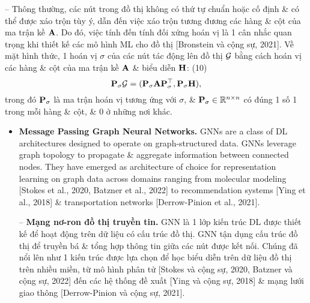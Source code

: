 \documentclass{article}
\begin{document}
\begin{itemize}
    -- Thông thường, các nút trong đồ thị không có thứ tự chuẩn hoặc cố định \& có thể được xáo trộn tùy ý, dẫn đến việc xáo trộn tương đương các hàng \& cột của ma trận kề ${\bf A}$. Do đó, việc tính đến tính đối xứng hoán vị là 1 cân nhắc quan trọng khi thiết kế các mô hình ML cho đồ thị [Bronstein và cộng sự, 2021]. Về mặt hình thức, 1 hoán vị $\sigma$ của các nút tác động lên đồ thị ${\cal G}$ bằng cách hoán vị các hàng \& cột của ma trận kề ${\bf A}$ \& biểu diễn ${\bf H}$: (10)
    \begin{equation*}
        {\bf P}_\sigma{\cal G} = ({\bf P}_\sigma{\bf A}{\bf P}_\sigma^\top,{\bf P}_\sigma{\bf H}),
    \end{equation*}
    trong đó ${\bf P}_\sigma$ là ma trận hoán vị tương ứng với $\sigma$, \& ${\bf P}_\sigma\in\mathbb{R}^{n\times n}$ có đúng 1 số 1 trong mỗi hàng \& cột, \& 0 ở những nơi khác.
    \begin{itemize}
        \item {\bf Message Passing Graph Neural Networks.} GNNs are a class of DL architectures designed to operate on graph-structured data. GNNs leverage graph topology to propagate \& aggregate information between connected nodes. They have emerged as architecture of choice for representation learning on graph data across domains ranging from molecular modeling [Stokes et al., 2020, Batzner et al., 2022] to recommendation systems [Ying et al., 2018] \& transportation networks [Derrow-Pinion et al., 2021].

        -- {\bf Mạng nơ-ron đồ thị truyền tin.} GNN là 1 lớp kiến trúc DL được thiết kế để hoạt động trên dữ liệu có cấu trúc đồ thị. GNN tận dụng cấu trúc đồ thị để truyền bá \& tổng hợp thông tin giữa các nút được kết nối. Chúng đã nổi lên như 1 kiến trúc được lựa chọn để học biểu diễn trên dữ liệu đồ thị trên nhiều miền, từ mô hình phân tử [Stokes và cộng sự, 2020, Batzner và cộng sự, 2022] đến các hệ thống đề xuất [Ying và cộng sự, 2018] \& mạng lưới giao thông [Derrow-Pinion và cộng sự, 2021].


\end{itemize}
\end{itemize}
\end{document}
